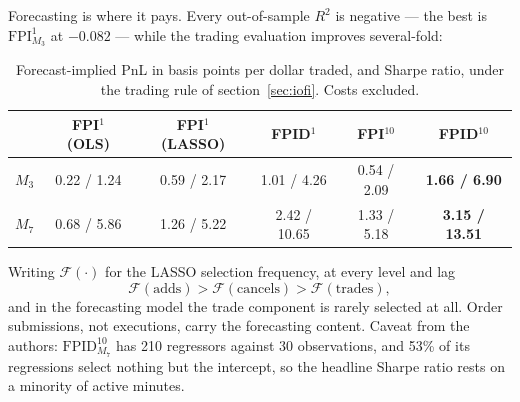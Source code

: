 \documentclass[11pt]{article}
\begin{document}
Forecasting is where it pays. Every out-of-sample $R^2$ is negative --- the best
is $\mathrm{FPI}^1_{M_3}$ at $-0.082$ --- while the trading evaluation improves
several-fold:

\begin{table}[h]
\centering
\captionsetup{font=small}
\caption{Forecast-implied PnL in basis points per dollar traded, and Sharpe
ratio, under the trading rule of section~\ref{sec:iofi}. Costs excluded.}
\small
\begin{tabular}{lccccc}
\toprule
& FPI$^1$ (OLS) & FPI$^1$ (LASSO) & FPID$^1$ & FPI$^{10}$ & FPID$^{10}$ \\
\midrule
$M_3$ & 0.22 / 1.24 & 0.59 / 2.17 & 1.01 / 4.26 & 0.54 / 2.09 & \textbf{1.66 / 6.90} \\
$M_7$ & 0.68 / 5.86 & 1.26 / 5.22 & 2.42 / 10.65 & 1.33 / 5.18 & \textbf{3.15 / 13.51} \\
\bottomrule
\end{tabular}
\end{table}

Writing $\mathcal{F}(\cdot)$ for the LASSO selection frequency, at every level
and lag
\[
\mathcal{F}(\mathrm{adds})>\mathcal{F}(\mathrm{cancels})>\mathcal{F}(\mathrm{trades}),
\]
and in the forecasting model the trade component is rarely selected at all.
Order submissions, not executions, carry the forecasting content. Caveat from
the authors: $\mathrm{FPID}^{10}_{M_7}$ has 210 regressors against 30
observations, and 53\% of its regressions select nothing but the intercept, so
the headline Sharpe ratio rests on a minority of active minutes.
\end{document}

